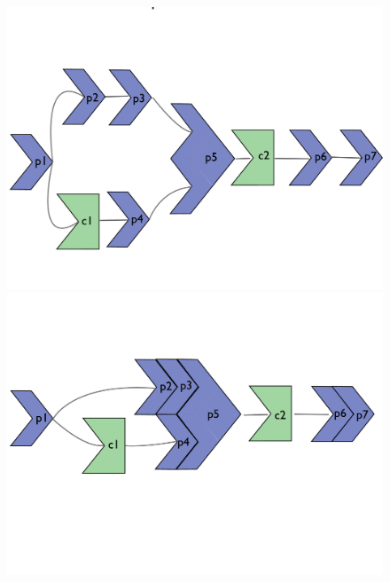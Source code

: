\begin{figure}[htb]
    \centering  \includegraphics[scale=0.245]{images/opt/fusion1.pdf} \\
    \centering  \includegraphics[scale=0.245]{images/opt/fusion2.pdf} \\

\end{figure}
